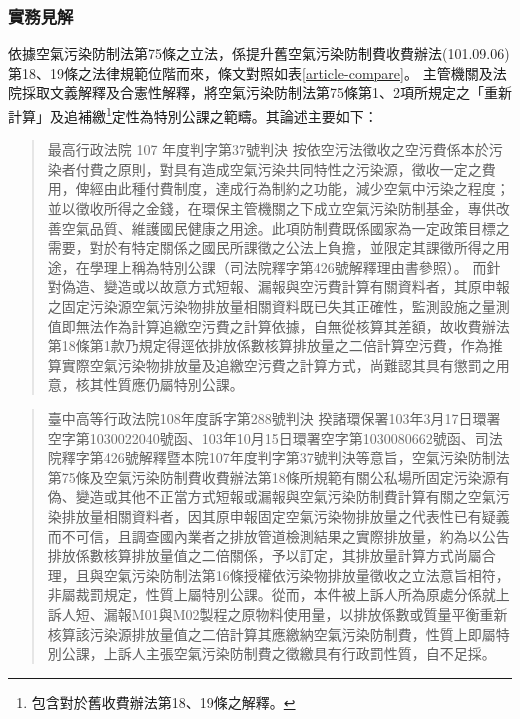 \subsubsection{實務見解}
依據空氣污染防制法第75條之立法，係提升舊空氣污染防制費收費辦法(101.09.06)第18、19條之法律規範位階而來，條文對照如表\ref{article-compare}。
主管機關及法院採取文義解釋及合憲性解釋，將空氣污染防制法第75條第1、2項所規定之「重新計算」及追補繳\footnote{包含對於舊收費辦法第18、19條之解釋。}定性為特別公課之範疇。其論述主要如下：

\begin{quote}{最高行政法院 107 年度判字第37號判決}
   按依空污法徵收之空污費係本於污染者付費之原則，對具有造成空氣污染共同特性之污染源，徵收一定之費用，俾經由此種付費制度，達成行為制約之功能，減少空氣中污染之程度；並以徵收所得之金錢，在環保主管機關之下成立空氣污染防制基金，專供改善空氣品質、維護國民健康之用途。此項防制費既係國家為一定政策目標之需要，對於有特定關係之國民所課徵之公法上負擔，並限定其課徵所得之用途，在學理上稱為特別公課（司法院釋字第426號解釋理由書參照）。
   而針對偽造、變造或以故意方式短報、漏報與空污費計算有關資料者，其原申報之固定污染源空氣污染物排放量相關資料既已失其正確性，監測設施之量測值即無法作為計算追繳空污費之計算依據，自無從核算其差額，故收費辦法第18條第1款乃規定得逕依排放係數核算排放量之二倍計算空污費，作為推算實際空氣污染物排放量及追繳空污費之計算方式，尚難認其具有懲罰之用意，核其性質應仍屬特別公課。
\end{quote}

\begin{quote}{臺中高等行政法院108年度訴字第288號判決}
   揆諸環保署103年3月17日環署空字第1030022040號函、103年10月15日環署空字第1030080662號函、司法院釋字第426號解釋暨本院107年度判字第37號判決等意旨，空氣污染防制法第75條及空氣污染防制費收費辦法第18條所規範有關公私場所固定污染源有偽、變造或其他不正當方式短報或漏報與空氣污染防制費計算有關之空氣污染排放量相關資料者，因其原申報固定空氣污染物排放量之代表性已有疑義而不可信，且調查國內業者之排放管道檢測結果之實際排放量，約為以公告排放係數核算排放量值之二倍關係，予以訂定，其排放量計算方式尚屬合理，且與空氣污染防制法第16條授權依污染物排放量徵收之立法意旨相符，非屬裁罰規定，性質上屬特別公課。從而，本件被上訴人所為原處分係就上訴人短、漏報M01與M02製程之原物料使用量，以排放係數或質量平衡重新核算該污染源排放量值之二倍計算其應繳納空氣污染防制費，性質上即屬特別公課，上訴人主張空氣污染防制費之徵繳具有行政罰性質，自不足採。
\end{quote}




